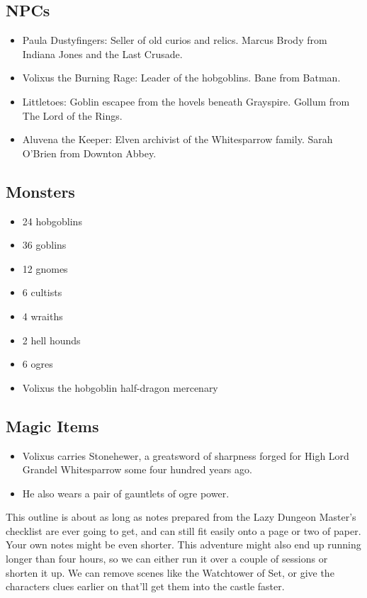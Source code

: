 \documentclass[10pt,a4paper,twoside,bg=print,twocolumn,openany,nodeprecatedcode]{dndbook}
\begin{document}
\subsection{NPCs}

\begin{itemize}
\item Paula Dustyfingers: Seller of old curios and relics. Marcus Brody from Indiana Jones and the Last Crusade.
\item Volixus the Burning Rage: Leader of the hobgoblins. Bane from Batman.
\item Littletoes: Goblin escapee from the hovels beneath Grayspire. Gollum from The Lord of the Rings.
\item Aluvena the Keeper: Elven archivist of the Whitesparrow family. Sarah O'Brien from Downton Abbey.
\end{itemize}

\subsection{Monsters}

\begin{itemize}
\item 24 hobgoblins
\item 36 goblins
\item 12 gnomes
\item 6 cultists
\item 4 wraiths
\item 2 hell hounds
\item 6 ogres
\item Volixus the hobgoblin half-dragon mercenary
\end{itemize}

\subsection{Magic Items}

\begin{itemize}
\item Volixus carries Stonehewer, a greatsword of sharpness forged for High Lord Grandel Whitesparrow some four hundred years ago.
\item He also wears a pair of gauntlets of ogre power.
\end{itemize}

This outline is about as long as notes prepared from the Lazy Dungeon Master's checklist are ever going to get, and can still fit easily onto a page or two of paper. Your own notes might be even shorter. This adventure might also end up running longer than four hours, so we can either run it over a couple of sessions or shorten it up. We can remove scenes like the Watchtower of Set, or give the characters clues earlier on that'll get them into the castle faster.
\end{document}
